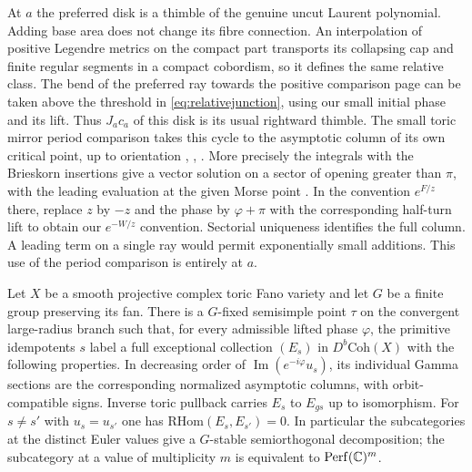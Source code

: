 At $a$ the preferred disk is a thimble of the genuine uncut Laurent polynomial. Adding base area does not change its fibre connection. An interpolation of positive Legendre metrics on the compact part transports its collapsing cap and finite regular segments in a compact cobordism, so it defines the same relative class. The bend of the preferred ray towards the positive comparison page can be taken above the threshold in \eqref{eq:relativejunction}, using our small initial phase and its lift. Thus $J_a c_a$ of this disk is its usual rightward thimble. The small toric mirror period comparison takes this cycle to the asymptotic column of its own critical point, up to orientation \cite[\S6.2]{FZ}, \cite[proof of Theorem~6.4]{GI}, \cite[Theorem~7.5]{GHIKLS}. More precisely the integrals with the Brieskorn insertions give a vector solution on a sector of opening greater than $\pi$, with the leading evaluation at the given Morse point \cite[Proposition~6.18]{IriGlobal}. In the convention $e^{F/z}$ there, replace $z$ by $-z$ and the phase by $\varphi+\pi$ with the corresponding half-turn lift to obtain our $e^{-W/z}$ convention. Sectorial uniqueness identifies the full column. A leading term on a single ray would permit exponentially small additions. This use of the period comparison is entirely at $a$.

\begin{theorem}\label{thm:markedcollection}
Let $X$ be a smooth projective complex toric Fano variety and let $G$ be a finite group preserving its fan. There is a $G$-fixed semisimple point $\tau$ on the convergent large-radius branch such that, for every admissible lifted phase $\varphi$, the primitive idempotents $s$ label a full exceptional collection $(E_s)$ in $D^b\mathrm{Coh}(X)$ with the following properties. In decreasing order of $\operatorname{Im}(e^{-i\varphi}u_s)$, its individual Gamma sections are the corresponding normalized asymptotic columns, with orbit-compatible signs. Inverse toric pullback carries $E_s$ to $E_{gs}$ up to isomorphism. For $s\ne s'$ with $u_s=u_{s'}$ one has $\mathrm{RHom}(E_s,E_{s'})=0$. In particular the subcategories at the distinct Euler values give a $G$-stable semiorthogonal decomposition; the subcategory at a value of multiplicity $m$ is equivalent to $\mathrm{Perf}(\mathbb C)^m$.
\end{theorem}

